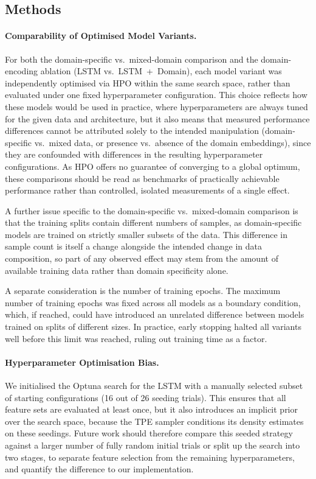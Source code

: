 \subsection*{Methods}

\paragraph{Comparability of Optimised Model Variants.}
\label{paragraph:comparability}
For both the domain-specific vs.\ mixed-domain comparison and the domain-encoding ablation (\ac{LSTM} vs.\ \ac{LSTM}~+~Domain), each model variant was independently optimised via \ac{HPO} within the same search space, rather than evaluated under one fixed hyperparameter configuration. This choice reflects how these models would be used in practice, where hyperparameters are always tuned for the given data and architecture, but it also means that measured performance differences cannot be attributed solely to the intended manipulation (domain-specific vs.\ mixed data, or presence vs.\ absence of the domain embeddings), since they are confounded with differences in the resulting hyperparameter configurations. As \ac{HPO} offers no guarantee of converging to a global optimum, these comparisons should be read as benchmarks of practically achievable performance rather than controlled, isolated measurements of a single effect.

A further issue specific to the domain-specific vs.\ mixed-domain comparison is that the training splits contain different numbers of samples, as domain-specific models are trained on strictly smaller subsets of the data. This difference in sample count is itself a change alongside the intended change in data composition, so part of any observed effect may stem from the amount of available training data rather than domain specificity alone.

A separate consideration is the number of training epochs. The maximum number of training epochs was fixed across all models as a boundary condition, which, if reached, could have introduced an unrelated difference between models trained on splits of different sizes. In practice, early stopping halted all variants well before this limit was reached, ruling out training time as a factor.


\paragraph{Hyperparameter Optimisation Bias.}
\label{lim:prior}
We initialised the Optuna search for the \ac{LSTM} with a manually selected subset of starting configurations (16 out of 26 seeding trials). This ensures that all feature sets are evaluated at least once, but it also introduces an implicit prior over the search space, because the \ac{TPE} sampler conditions its density estimates on these seedings. Future work should therefore compare this seeded strategy against a larger number of fully random initial trials or split up the search into two stages, to separate feature selection from the remaining hyperparameters, and quantify the difference to our implementation.


